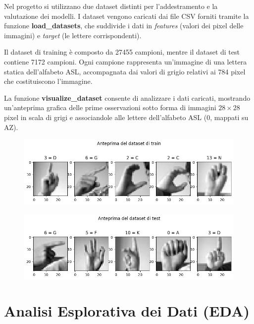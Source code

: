 \documentclass{article}
\begin{document}
Nel progetto si utilizzano due dataset distinti per l'addestramento e la valutazione dei modelli. 
I dataset vengono caricati dai file CSV forniti tramite la funzione \textbf{load\_datasets}, che suddivide i dati 
in \textit{features} (valori dei pixel delle immagini) e \textit{target} (le lettere corrispondenti).

Il dataset di training è composto da 27455 campioni, mentre il dataset di test contiene 7172 campioni. 
Ogni campione rappresenta un'immagine di una lettera statica dell'alfabeto ASL, accompagnata dai valori di 
grigio relativi ai 784 pixel che costituiscono l'immagine.

La funzione \textbf{visualize\_dataset} consente di analizzare i dati caricati, mostrando un'anteprima grafica delle 
prime osservazioni sotto forma di immagini \(28\times28\) pixel in scala di grigi e associandole alle lettere 
dell'alfabeto ASL (0, mappati su A\-Z).

\begin{figure}[H]
    \centering
    \includegraphics[scale=0.5]{Figures/output.png}\label{fig:dataset}
\end{figure}

\begin{figure}[H]  
    \centering
    \includegraphics[scale=0.5]{Figures/output1.png}\label{fig:dataset_test}
\end{figure}

\clearpage

\section{Analisi Esplorativa dei Dati (EDA)}
\end{document}
